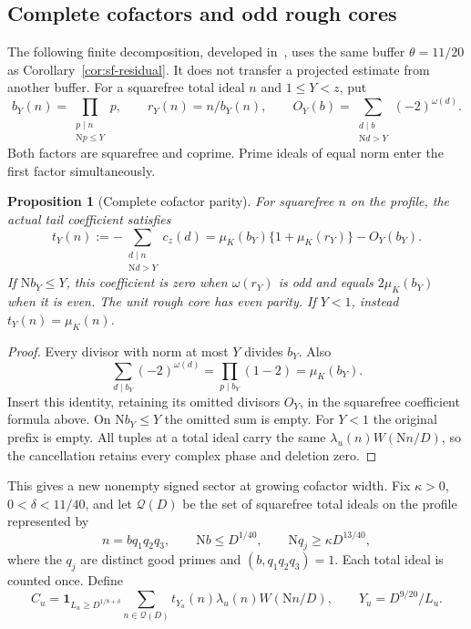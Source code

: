 \documentclass[11pt]{article}
\numberwithin{equation}{section}
\newtheorem{proposition}[theorem]{Proposition}
\theoremstyle{definition}
\theoremstyle{remark}
\newcommand{\N}{\mathrm N}
\newcommand{\muK}{\mu_K}
\newcommand{\ind}{\mathbf 1}
\begin{document}
\subsection{Complete cofactors and odd rough cores}
\label{sec:rough-parity}

The following finite decomposition, developed in~\cite{N21}, uses the
same buffer \(\theta=11/20\) as Corollary~\ref{cor:sf-residual}.
It does not transfer a projected estimate from another buffer.
For a squarefree total ideal \(n\) and \(1\le Y<z\), put
\[
 b_Y(n)=\prod_{\substack{p\mid n\\\N p\le Y}}p,
 \qquad r_Y(n)=n/b_Y(n),\qquad
 O_Y(b)=\sum_{\substack{d\mid b\\\N d>Y}}(-2)^{\omega(d)}.
\]
Both factors are squarefree and coprime. Prime ideals of equal norm
enter the first factor simultaneously.

\begin{proposition}[Complete cofactor parity]\label{prop:rough-parity}
For squarefree \(n\) on the profile, the actual tail coefficient satisfies
\begin{equation}\label{eq:rough-parity}
 t_Y(n):=-\sum_{\substack{d\mid n\\\N d>Y}}c_z(d)
  =\muK(b_Y)\{1+\muK(r_Y)\}-O_Y(b_Y).
\end{equation}
If \(\N b_Y\le Y\), this coefficient is zero when
\(\omega(r_Y)\) is odd and equals \(2\muK(b_Y)\) when it is even.
The unit rough core has even parity. If \(Y<1\), instead
\(t_Y(n)=\muK(n)\).
\end{proposition}
\begin{proof}
Every divisor with norm at most \(Y\) divides \(b_Y\). Also
\[
 \sum_{d\mid b_Y}(-2)^{\omega(d)}
       =\prod_{p\mid b_Y}(1-2)=\muK(b_Y).
\]
Insert this identity, retaining its omitted divisors \(O_Y\), in the
squarefree coefficient formula above. On \(\N b_Y\le Y\) the omitted
sum is empty. For \(Y<1\) the original prefix is empty.
All tuples at a total ideal carry the same \(\lambda_u(n)W(\N n/D)\),
so the cancellation retains every complex phase and deletion zero.
\end{proof}

This gives a new nonempty signed sector at growing cofactor width.
Fix \(\kappa>0\), \(0<\delta<11/40\), and let \(\mathcal Q(D)\)
be the set of squarefree total ideals on the profile represented by
\[
 n=bq_1q_2q_3,\qquad \N b\le D^{1/40},\qquad
 \N q_j\ge\kappa D^{13/40},
\]
where the \(q_j\) are distinct good primes and \((b,q_1q_2q_3)=1\).
Each total ideal is counted once. Define
\[
 C_u=\ind_{L_u\ge D^{1/8+\delta}}
       \sum_{n\in\mathcal Q(D)}t_{Y_u}(n)\lambda_u(n)W(\N n/D),
 \qquad Y_u=D^{9/20}/L_u.
\]
\end{document}
